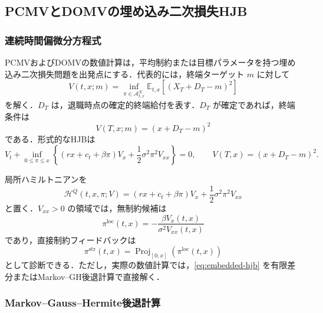 \documentclass[10pt,a4paper]{article}
\theoremstyle{plain}
\theoremstyle{definition}
\newcommand{\E}{\mathbb{E}}
\DeclareMathOperator{\Proj}{Proj}
\newcommand{\A}{\mathcal{A}}
\newcommand{\Hamil}{\mathcal{H}}
\begin{document}
\subsection{PCMVとDOMVの埋め込み二次損失HJB}
\label{sec:embedded}

\subsubsection{連続時間偏微分方程式}

PCMVおよびDOMVの数値計算は，平均制約または目標パラメータを持つ埋め込み二次損失問題を出発点にする．代表的には，終端ターゲット $m$ に対して
\begin{equation}
  V(t,x;m)=\inf_{\pi\in\A^X_{t,x}}
  \E_{t,x}\left[(X_T+D_T-m)^2\right]
  \label{eq:embedded-value}
\end{equation}
を解く．$D_T$ は，退職時点の確定的終端給付を表す．$D_T$ が確定であれば，終端条件は
\begin{equation}
  V(T,x;m)=(x+D_T-m)^2
  \label{eq:embedded-terminal}
\end{equation}
である．形式的なHJBは
\begin{equation}
  V_t+
  \inf_{0\leq\pi\leq x}
  \left\{
    (rx+c_t+\beta\pi)V_x
    +\frac{1}{2}\sigma^2\pi^2 V_{xx}
  \right\}=0,
  \qquad
  V(T,x)=(x+D_T-m)^2.
  \label{eq:embedded-hjb}
\end{equation}

局所ハミルトニアンを
\begin{equation}
  \Hamil^Q(t,x,\pi;V)
  =(rx+c_t+\beta\pi)V_x
  +\frac{1}{2}\sigma^2\pi^2 V_{xx}
  \label{eq:quadratic-ham}
\end{equation}
と置く．$V_{xx}>0$ の領域では，無制約候補は
\begin{equation}
  \pi^{\mathrm{loc}}(t,x)
  =-\frac{\beta V_x(t,x)}{\sigma^2 V_{xx}(t,x)}
  \label{eq:loc-pi-quadratic}
\end{equation}
であり，直接制約フィードバックは
\begin{equation}
  \pi^{\mathrm{str}}(t,x)
  =\Proj_{[0,x]}\left(\pi^{\mathrm{loc}}(t,x)\right)
  \label{eq:proj-quadratic}
\end{equation}
として診断できる．ただし，実際の数値計算では，\eqref{eq:embedded-hjb} を有限差分またはMarkov--GH後退計算で直接解く．

\subsubsection{Markov--Gauss--Hermite後退計算}
\end{document}
